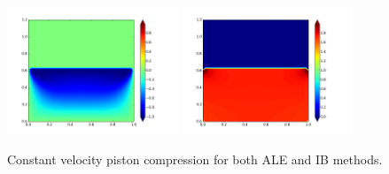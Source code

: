\documentclass{article}
\begin{document}
\begin{figure}
{\includegraphics[width=2in]{contour-V25-IBcon.png} \hspace{-20pt}
\includegraphics[width=2in]{contour-P25-IBcon.png} 
}
\caption{\label{fig:constcomp} Constant velocity piston compression for both ALE and IB methods.} 
\end{figure}
%
\end{document}
